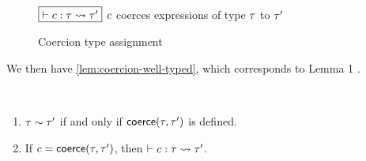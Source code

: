\documentclass[index.tex]{subfiles}
\begin{document}
\begin{figure}[htb!]
  $\judgbox{\ctxCoercesType{}{\CMV}{\TMV}{\TMV'}}$ $\CMV$ coerces expressions of type $\TMV$ to $\TMV'$

  \begin{mathpar}








  \end{mathpar}
  \caption{Coercion type assignment}
  \label{fig:coercion-types}
\end{figure}

We then have \cref{lem:coercion-well-typed}, which corresponds to Lemma 1 \cite{herman2010}.
%
\begin{lemmat}[name=Well-typed coercions, label=lem:coercion-well-typed] \
  \begin{enumerate}
    \item $\isConsistent{\TMV}{\TMV'}$ if and only if $\coerce(\TMV, \TMV')$ is defined.
    \item If $\CMV = \coerce(\TMV, \TMV')$, then $\ctxCoercesType{}{\CMV}{\TMV}{\TMV'}$.
  \end{enumerate}
\end{lemmat}
\end{document}

